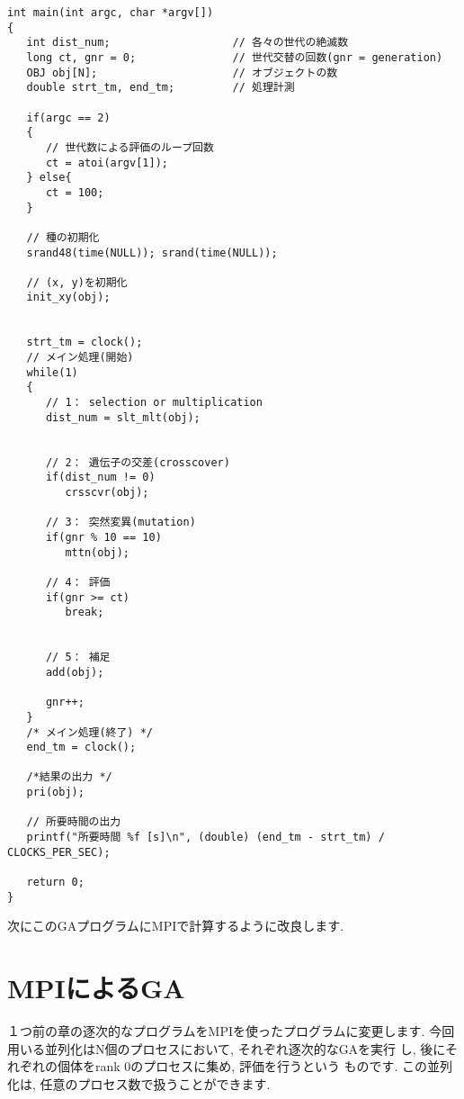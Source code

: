 \documentclass[a4paper,titlepage]{jreport}
\begin{document}
\begin{verbatim}
int main(int argc, char *argv[])
{
   int dist_num;                   // 各々の世代の絶滅数
   long ct, gnr = 0;               // 世代交替の回数(gnr = generation)
   OBJ obj[N];                     // オブジェクトの数
   double strt_tm, end_tm;         // 処理計測

   if(argc == 2)
   {
      // 世代数による評価のループ回数
      ct = atoi(argv[1]);
   } else{
      ct = 100;
   }

   // 種の初期化
   srand48(time(NULL)); srand(time(NULL));

   // (x, y)を初期化
   init_xy(obj);


   strt_tm = clock();
   // メイン処理(開始)
   while(1)
   {
      // 1： selection or multiplication
      dist_num = slt_mlt(obj);


      // 2： 遺伝子の交差(crosscover)
      if(dist_num != 0)
         crsscvr(obj);

      // 3： 突然変異(mutation)
      if(gnr % 10 == 10)
         mttn(obj);

      // 4： 評価
      if(gnr >= ct)
         break;


      // 5： 補足
      add(obj);

      gnr++;
   }
   /* メイン処理(終了) */
   end_tm = clock();
   
   /*結果の出力 */
   pri(obj);

   // 所要時間の出力
   printf("所要時間 %f [s]\n", (double) (end_tm - strt_tm) / CLOCKS_PER_SEC);

   return 0;
}
\end{verbatim}

次にこのGAプログラムにMPIで計算するように改良します.

\chapter{MPIによるGA}

１つ前の章の逐次的なプログラムをMPIを使ったプログラムに変更します.
今回用いる並列化はN個のプロセスにおいて, それぞれ逐次的なGAを実行
し, 後にそれぞれの個体をrank 0のプロセスに集め, 評価を行うという
ものです. この並列化は, 任意のプロセス数で扱うことができます.
\end{document}
